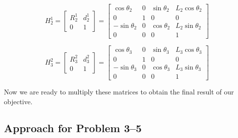 \documentclass[conference]{IEEEtran}
\begin{document}
\[
    H^1_2 = \begin{bmatrix}
        R^1_2 & d^1_2\\
        0 & 1
    \end{bmatrix}
    =
    \begin{bmatrix}
        \cos\theta _{2} & 0 & \sin\theta _{2} & L_{2} \cos\theta_2\\
        0 & 1 & 0 & 0\\
        -\sin\theta _{2} & 0 & \cos\theta_{2} & L_2 \sin\theta_2\\
        0 & 0 & 0 & 1
    \end{bmatrix}
\]

\[
    H^2_3 = \begin{bmatrix}
        R^2_3 & d^2_3\\
        0 & 1
    \end{bmatrix}
    =
    \begin{bmatrix}
        \cos\theta _{3} & 0 & \sin\theta _{3} & L_{3} \cos\theta_3\\
        0 & 1 & 0 & 0\\
        -\sin\theta _{3} & 0 & \cos\theta_{3} & L_3 \sin\theta_3\\
        0 & 0 & 0 & 1
    \end{bmatrix}
\]

Now we are ready to multiply these matrices to obtain the final result
of our objective.

\subsection{Approach for Problem 3--5}
\end{document}
